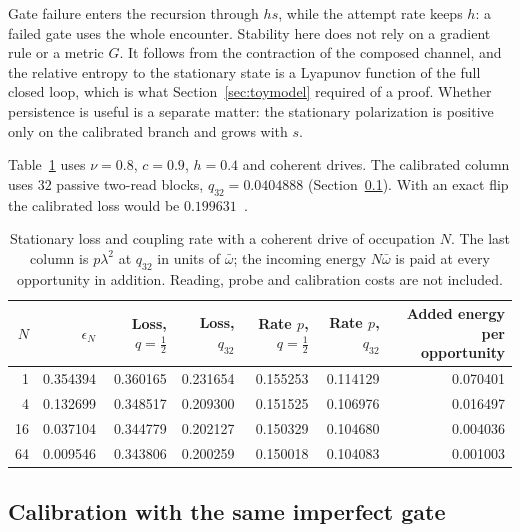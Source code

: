 \documentclass[aps,pre,onecolumn,superscriptaddress,floatfix,longbibliography]{revtex4-2}
\begin{document}
Gate failure enters the recursion through $hs$, while the attempt rate keeps $h$: a failed gate uses the whole encounter. Stability here does not rely on a gradient rule or a metric $G$. It follows from the contraction of the composed channel, and the relative entropy to the stationary state is a Lyapunov function of the full closed loop, which is what Section~\ref{sec:toymodel} required of a proof. Whether persistence is useful is a separate matter: the stationary polarization is positive only on the calibrated branch and grows with $s$.

Table~\ref{tab:task} uses $\nu=0.8$, $c=0.9$, $h=0.4$ and coherent drives. The calibrated column uses $32$ passive two-read blocks, $q_{32}=0.0404888$ (Section~\ref{sec:calib}). With an exact flip the calibrated loss would be $0.199631$~\cite{Liu2026Chain}.

\begin{table}[h]
\centering
\begin{tabular}{@{}rrrrrrr@{}}
\toprule
$N$ & $\epsilon_N$ & Loss, $q=\tfrac12$ & Loss, $q_{32}$ & Rate $p$, $q=\tfrac12$ & Rate $p$, $q_{32}$ & Added energy per opportunity\\
\midrule
1 & 0.354394 & 0.360165 & 0.231654 & 0.155253 & 0.114129 & 0.070401\\
4 & 0.132699 & 0.348517 & 0.209300 & 0.151525 & 0.106976 & 0.016497\\
16 & 0.037104 & 0.344779 & 0.202127 & 0.150329 & 0.104680 & 0.004036\\
64 & 0.009546 & 0.343806 & 0.200259 & 0.150018 & 0.104083 & 0.001003\\
\bottomrule
\end{tabular}
\caption{Stationary loss and coupling rate with a coherent drive of occupation $N$. The last column is $p\lambda^2$ at $q_{32}$ in units of $\bar\omega$; the incoming energy $N\bar\omega$ is paid at every opportunity in addition. Reading, probe and calibration costs are not included.}
\label{tab:task}
\end{table}

\subsection{Calibration with the same imperfect gate}
\label{sec:calib}
\end{document}
